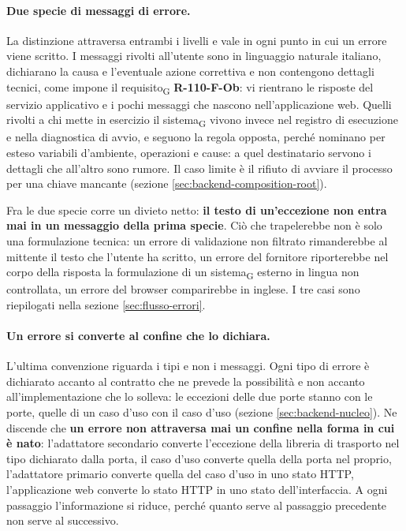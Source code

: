 \documentclass[a4paper, 10pt]{article}
\begin{document}
\paragraph{Due specie di messaggi di errore.}
La distinzione attraversa entrambi i livelli e vale in ogni punto in cui un errore viene scritto. I messaggi rivolti all'utente sono in linguaggio naturale italiano, dichiarano la causa e l'eventuale azione correttiva e non contengono dettagli tecnici, come impone il requisito\textsubscript{G} \textbf{R-110-F-Ob}: vi rientrano le risposte del servizio applicativo e i pochi messaggi che nascono nell'applicazione web. Quelli rivolti a chi mette in esercizio il sistema\textsubscript{G} vivono invece nel registro di esecuzione e nella diagnostica di avvio, e seguono la regola opposta, perché nominano per esteso variabili d'ambiente, operazioni e cause: a quel destinatario servono i dettagli che all'altro sono rumore. Il caso limite è il rifiuto di avviare il processo per una chiave mancante (sezione \ref{sec:backend-composition-root}).

\noindent Fra le due specie corre un divieto netto: \textbf{il testo di un'eccezione non entra mai in un messaggio della prima specie}. Ciò che trapelerebbe non è solo una formulazione tecnica: un errore di validazione non filtrato rimanderebbe al mittente il testo che l'utente ha scritto, un errore del fornitore riporterebbe nel corpo della risposta la formulazione di un sistema\textsubscript{G} esterno in lingua non controllata, un errore del browser comparirebbe in inglese. I tre casi sono riepilogati nella sezione \ref{sec:flusso-errori}.

\paragraph{Un errore si converte al confine che lo dichiara.}
L'ultima convenzione riguarda i tipi e non i messaggi. Ogni tipo di errore è dichiarato accanto al contratto che ne prevede la possibilità e non accanto all'implementazione che lo solleva: le eccezioni delle due porte stanno con le porte, quelle di un caso d'uso con il caso d'uso (sezione \ref{sec:backend-nucleo}). Ne discende che \textbf{un errore non attraversa mai un confine nella forma in cui è nato}: l'adattatore secondario converte l'eccezione della libreria di trasporto nel tipo dichiarato dalla porta, il caso d'uso converte quella della porta nel proprio, l'adattatore primario converte quella del caso d'uso in uno stato HTTP, l'applicazione web converte lo stato HTTP in uno stato dell'interfaccia. A ogni passaggio l'informazione si riduce, perché quanto serve al passaggio precedente non serve al successivo.
\end{document}
